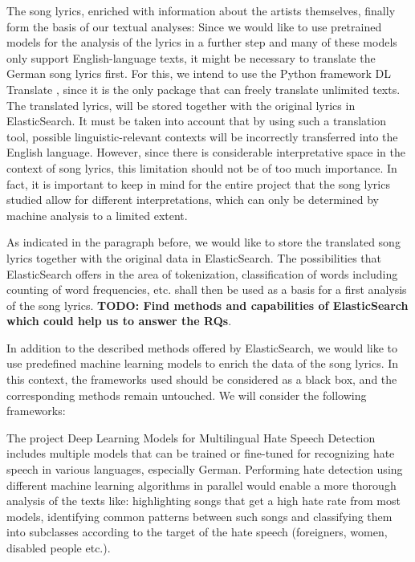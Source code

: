 The song lyrics, enriched with information about the artists themselves, finally form the basis of our textual analyses: Since we would like to use pretrained models for the analysis of the lyrics in a further step and many of these models only support English-language texts, it might be necessary to translate the German song lyrics first. For this, we intend to use the Python framework DL Translate \cite{lu_2022}, since it is the only package that can freely translate unlimited texts. The translated lyrics, will be stored together with the original lyrics in ElasticSearch. It must be taken into account that by using such a translation tool, possible linguistic-relevant contexts will be incorrectly transferred into the English language. However, since there is considerable interpretative space in the context of song lyrics, this limitation should not be of too much importance. In fact, it is important to keep in mind for the entire project that the song lyrics studied allow for different interpretations, which can only be determined by machine analysis to a limited extent.

As indicated in the paragraph before, we would like to store the translated song lyrics together with the original data in ElasticSearch. The possibilities that ElasticSearch offers in the area of tokenization, classification of words including counting of word frequencies, etc. shall then be used as a basis for a first analysis of the song lyrics.
\textbf{TODO: Find methods and capabilities of ElasticSearch which could help us to answer the RQs}.

In addition to the described methods offered by ElasticSearch, we would like to use predefined machine learning models to enrich the data of the song lyrics. In this context, the frameworks used should be considered as a black box, and the corresponding methods remain untouched. We will consider the following frameworks:

The project Deep Learning Models for Multilingual Hate Speech Detection \cite{deepMLhatespeech} includes multiple models that can be trained or fine-tuned for recognizing hate speech in various languages, especially German. Performing hate detection using different machine learning algorithms in parallel would enable a more thorough analysis of the texts like: highlighting songs that get a high hate rate from most models, identifying common patterns between such songs and classifying them into subclasses according to the target of the hate speech (foreigners, women, disabled people etc.).

